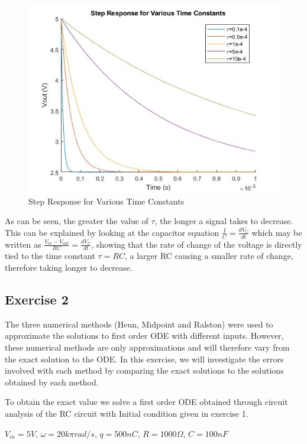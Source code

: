 \documentclass[11pt, oneside, titlepage]{article}   	%
\begin{document}
\begin{figure}[H]
\center
\includegraphics[scale = 0.5]{exercise1_15}
\caption{Step Response for Various Time Constants} \label{fig:ex1_15}
\end{figure}

As can be seen, the greater the value of $\tau$, the longer a signal takes to decrease. This can be explained by looking at the capacitor equation $\frac{I}{C} = \frac{dV_C}{dt}$ which may be written as $\frac{V_{in}-V_{out}}{RC} = \frac{dV_C}{dt}$, showing that the rate of change of the voltage is directly tied to the time constant $\tau = RC$, a larger RC causing a smaller rate of change, therefore taking longer to decrease. 




\subsection{Exercise 2}

The three numerical methods (Heun, Midpoint and Ralston) were used to approximate the solutions to first order ODE with different inputs. However, these numerical methods are only approximations and will therefore vary from the exact solution to the ODE. In this exercise, we will investigate the errors involved with each method by comparing the exact solutions to the solutions obtained by each method. 

To obtain the exact value we solve a first order ODE obtained through circuit analysis of the RC circuit with Initial condition given in exercise 1.

$V_{in} = 5V$, $\omega = 20k\pi rad/s$, $q = 500nC$, $R = 1000\Omega$, $C = 100nF$
\end{document}
